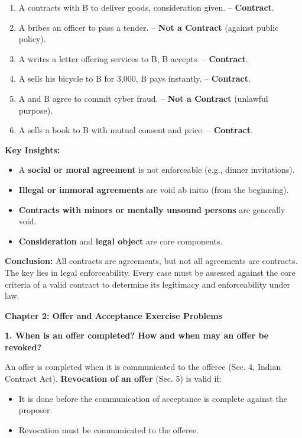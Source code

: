 \documentclass[12pt,a4paper]{book}
\begin{document}
\begin{enumerate}
    \item A contracts with B to deliver goods, consideration given. – \textbf{Contract}.
    \item A bribes an officer to pass a tender. – \textbf{Not a Contract} (against public policy).
    \item A writes a letter offering services to B, B accepts. – \textbf{Contract}.
    \item A sells his bicycle to B for 3,000, B pays instantly. – \textbf{Contract}.
    \item A and B agree to commit cyber fraud. – \textbf{Not a Contract} (unlawful purpose).
    \item A sells a book to B with mutual consent and price. – \textbf{Contract}.
\end{enumerate} 

\textbf{Key Insights:}
\begin{itemize}
    \item A \textbf{social or moral agreement} is not enforceable (e.g., dinner invitations).
    \item \textbf{Illegal or immoral agreements} are void ab initio (from the beginning).
    \item \textbf{Contracts with minors or mentally unsound persons} are generally void.
    \item \textbf{Consideration} and \textbf{legal object} are core components.
\end{itemize}

\textbf{Conclusion:}  
All contracts are agreements, but not all agreements are contracts. The key lies in legal enforceability. Every case must be assessed against the core criteria of a valid contract to determine its legitimacy and enforceability under law.

\vspace{1cm} 

\textbf{Chapter 2: Offer and Acceptance Exercise Problems} 
\vspace{0.5cm} 

\textbf{1. When is an offer completed? How and when may an offer be revoked?}  

An offer is completed when it is communicated to the offeree (Sec. 4, Indian Contract Act).  
\textbf{Revocation of an offer} (Sec. 5) is valid if:
\begin{itemize}
    \item It is done before the communication of acceptance is complete against the proposer.
    \item Revocation must be communicated to the offeree.
\end{itemize}
\end{document}
